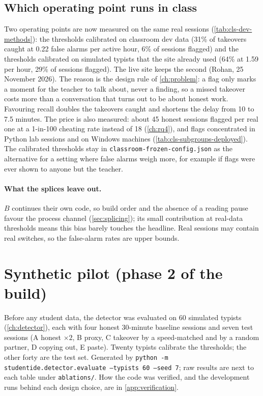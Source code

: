 \subsection{Which operating point runs in class}
\label{sec:operating-point}
Two operating points are now measured on the same real sessions (\cref{tab:cls-dev-methods}):
the thresholds calibrated on classroom dev data (31\% of takeovers caught at 0.22 false alarms
per active hour, 6\% of sessions flagged) and the thresholds calibrated on simulated typists
that the site already used (64\% at 1.59 per hour, 29\% of sessions flagged). The live site
keeps the second (Rohan, 25 November 2026). The reason is the design rule of
\cref{ch:problem}: a flag only marks a moment for the teacher to talk about, never a finding,
so a missed takeover costs more than a conversation that turns out to be about honest work.
Favouring recall doubles the takeovers caught and shortens the delay from 10 to 7.5 minutes.
The price is also measured: about 45 honest sessions flagged per real one at a 1-in-100
cheating rate instead of 18 (\cref{ch:rq4}), and flags concentrated in Python lab sessions and
on Windows machines (\cref{tab:cls-subgroups-deployed}). The calibrated thresholds stay in
\texttt{classroom-frozen-config.json} as the alternative for a setting where false alarms
weigh more, for example if flags were ever shown to anyone but the teacher.

\paragraph{What the splices leave out.} $B$ continues their own code, so build order and
the absence of a reading pause favour the process channel (\cref{sec:splicing}); its small
contribution at real-data thresholds means this bias barely touches the headline. Real
sessions may contain real switches, so the false-alarm rates are upper bounds.

\section{Synthetic pilot (phase 2 of the build)}
Before any student data, the detector was evaluated on 60 simulated typists
(\cref{ch:detector}), each with four honest 30-minute baseline sessions and
seven test sessions (A honest $\times 2$, B proxy, C takeover by a
speed-matched and by a random partner, D copying out, E paste). Twenty
typists calibrate the thresholds; the other forty are the test set.
Generated by \texttt{python -m studentide.detector.evaluate --typists 60
--seed 7}; raw results are next to each table under \texttt{ablations/}. How the code was
verified, and the development runs behind each design choice, are in
\cref{app:verification}.


